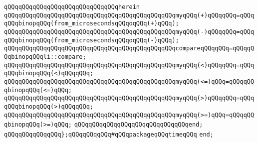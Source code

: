 \verb|qQQqqQQqqQQqqQQqqQQqqQQqqQQqqQQqherein|\newline
\newline
\verb|qQQqqQQqqQQqqQQqqQQqqQQqqQQqqQQqqQQqqQQqqQQqqQQqmyqQQq(+)qQQqqQQq=qQQqqQQqbinopqQQq(from_microsecondsqQQqoqQQq(+)qQQq);|\newline
\verb|qQQqqQQqqQQqqQQqqQQqqQQqqQQqqQQqqQQqqQQqqQQqqQQqmyqQQq(-)qQQqqQQq=qQQqqQQqbinopqQQq(from_microsecondsqQQqoqQQq(-)qQQq);|\newline
\newline
\verb|qQQqqQQqqQQqqQQqqQQqqQQqqQQqqQQqqQQqqQQqqQQqqQQqcompareqQQqqQQq=qQQqqQQqbinopqQQqli::compare;|\newline
\newline
\verb|qQQqqQQqqQQqqQQqqQQqqQQqqQQqqQQqqQQqqQQqqQQqqQQqmyqQQq(<)qQQqqQQq=qQQqqQQqbinopqQQq(<)qQQqqQQq;|\newline
\verb|qQQqqQQqqQQqqQQqqQQqqQQqqQQqqQQqqQQqqQQqqQQqqQQqmyqQQq(<=)qQQq=qQQqqQQqbinopqQQq(<=)qQQq;|\newline
\verb|qQQqqQQqqQQqqQQqqQQqqQQqqQQqqQQqqQQqqQQqqQQqqQQqmyqQQq(>)qQQqqQQq=qQQqqQQqbinopqQQq(>)qQQqqQQq;|\newline
\verb|qQQqqQQqqQQqqQQqqQQqqQQqqQQqqQQqqQQqqQQqqQQqqQQqmyqQQq(>=)qQQq=qQQqqQQqbinopqQQq(>=)qQQq;|\newline
\newline
\verb|qQQqqQQqqQQqqQQqqQQqqQQqqQQqqQQqend;|\newline
\newline
\verb|qQQqqQQqqQQqqQQq};qQQqqQQqqQQq#qQQqpackageqQQqtimeqQQq|\newline
\verb|end;|\newline
\newline
\newline


